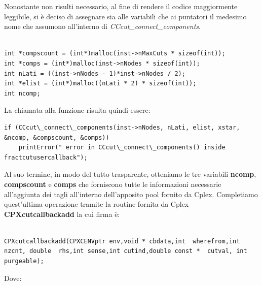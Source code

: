 \documentclass[11pt]{article}
\begin{document}
Nonostante non risulti necessario, al fine di rendere il codice maggiormente leggibile, si è deciso di assegnare sia alle variabili che ai puntatori il medesimo nome che assumono all’interno di \textit{CCcut\_connect\_components}.

\begin{lstlisting}

int *compscount = (int*)malloc(inst->nMaxCuts * sizeof(int));
int *comps = (int*)malloc(inst->nNodes * sizeof(int));
int nLati = ((inst->nNodes - 1)*inst->nNodes / 2);
int *elist = (int*)malloc((nLati * 2) * sizeof(int));
int ncomp; 

\end{lstlisting}

La chiamata alla funzione risulta quindi essere:

\begin{lstlisting}
if (CCcut\_connect\_components(inst->nNodes, nLati, elist, xstar, &ncomp, &compscount, &comps))
    printError(" error in CCcut\_connect\_components() inside fractcutusercallback");
\end{lstlisting}

Al suo termine, in modo del tutto trasparente, otteniamo le tre variabili \textbf{ncomp}, \textbf{compscount} e \textbf{comps} che forniscono tutte le informazioni necessarie all'aggiunta dei tagli all'interno dell'apposito pool fornito da Cplex.
Completiamo quest'ultima operazione tramite la routine fornita da Cplex \textbf{CPXcutcallbackadd} la cui firma è:

\begin{lstlisting}

CPXcutcallbackadd(CPXCENVptr env,void * cbdata,int  wherefrom,int  nzcnt, double  rhs,int sense,int cutind,double const *  cutval, int purgeable);

\end{lstlisting}

Dove:
\end{document}
